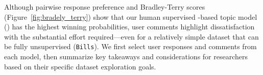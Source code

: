 
%
Although pairwise response preference and Bradley-Terry scores (Figure~\ref{fig:bradely_terry}) show that our human supervised \mm{}-based
topic model (\bass{}) has the highest winning probabilities, user comments 
highlight dissatisfaction with the substantial
effort required---even for a relatively simple
dataset that can be fully unsupervised (\texttt{Bills}).
%
We first select user responses and comments from each model, then summarize key takeaways and considerations for researchers based on their specific dataset exploration goals.

